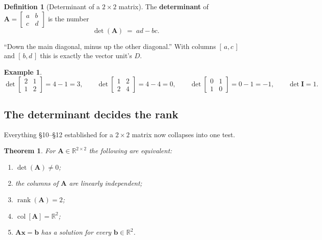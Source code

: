 \documentclass[11pt]{article}
\theoremstyle{plain}
\newtheorem{thm}{Theorem}[section]
\theoremstyle{definition}
\newtheorem{defn}{Definition}[section]
\newtheorem{ex}{Example}[section]
\theoremstyle{remark}
\newcommand{\R}{\mathbb{R}}
\newcommand{\vc}[1]{\mathbf{#1}}        %
\newcommand{\mt}[1]{\mathbf{#1}}        %
\newcommand{\colsp}[1]{\operatorname{col}[#1]}
\DeclareMathOperator{\rank}{rank}
\begin{document}
\begin{defn}[Determinant of a $2\times2$ matrix]
The \textbf{determinant} of $\mt{A}=\begin{bmatrix}a&b\\c&d\end{bmatrix}$ is
the number
\[
  \det(\mt{A}) \;=\; ad-bc .
\]
\end{defn}

\noindent ``Down the main diagonal, minus up the other diagonal.'' With columns
$[\,a,c\,]$ and $[\,b,d\,]$ this is exactly the vector unit's $D$.

\begin{ex}
\label{ex:dets}
\[
  \det\begin{bmatrix}2&1\\1&2\end{bmatrix}=4-1=3,\qquad
  \det\begin{bmatrix}1&2\\2&4\end{bmatrix}=4-4=0,\qquad
  \det\begin{bmatrix}0&1\\1&0\end{bmatrix}=0-1=-1,\qquad
  \det\mt{I}=1 .
\]
\end{ex}

\subsection{The determinant decides the rank}
Everything \S10--\S12 established for a $2\times2$ matrix now collapses into one
test.

\begin{thm}
\label{thm:det-rank}
For $\mt{A}\in\R^{2\times2}$ the following are equivalent:
\begin{enumerate}[label=(\roman*),leftmargin=2.2em,itemsep=2pt]
  \item $\det(\mt{A})\neq0$;
  \item the columns of $\mt{A}$ are linearly independent;
  \item $\rank(\mt{A})=2$;
  \item $\colsp{\mt{A}}=\R^{2}$;
  \item $\mt{A}\vc{x}=\vc{b}$ has a solution for every $\vc{b}\in\R^{2}$.
\end{enumerate}
\end{thm}
\end{document}
